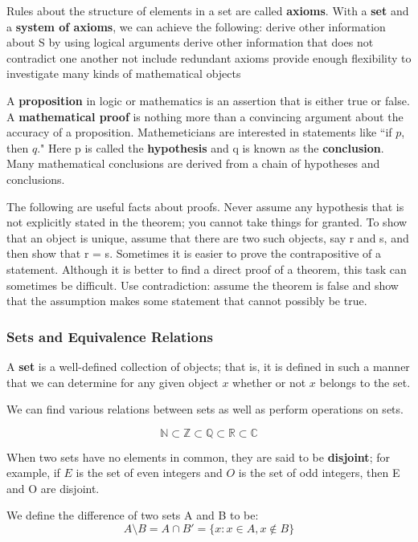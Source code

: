 \documentclass[11pt]{article} %
\begin{document}
\noindent
Rules about the structure of elements in a set are called \textbf{axioms}. With a \textbf{set} and a \textbf{system of axioms}, we can achieve the following:
\points
{derive other information about S by using logical arguments}
{derive other information that does not contradict one another}
{not include redundant axioms}
{provide enough flexibility to investigate many kinds of mathematical objects}

\noindent
A \textbf{proposition} in logic or mathematics is an assertion that is either true or false. A \textbf{mathematical proof} is nothing more than a convincing argument about the accuracy of a proposition. Mathemeticians are interested in statements like ``if $p$, then $q$." Here p is
called the \textbf{hypothesis} and q is known as the \textbf{conclusion}. Many mathematical conclusions are derived from a chain of hypotheses and conclusions.

The following are useful facts about proofs. Never assume any hypothesis that is not explicitly stated in the theorem; you cannot take things for granted. To show that an object is unique, assume that there are two such objects, say r and s, and then show that r = s. Sometimes it is easier to prove the contrapositive of a statement. Although it is better to find a direct proof of a theorem, this task can sometimes be difficult. Use contradiction: assume the theorem is false and show that the assumption makes some statement that cannot possibly be true.

\subsubsection{Sets and Equivalence Relations}
{A \textbf{set} is a well-defined collection of objects; that is, it is defined in such a manner that we can determine for any given object $x$ whether or not $x$ belongs to the set.}

We can find various relations between sets as well as perform operations on sets.

{$$
\mathbb{N} \subset \mathbb{Z} \subset \mathbb{Q} \subset \mathbb{R} \subset \mathbb{C}
$$}

When two sets have no elements in common, they are said to be \textbf{disjoint}; for example, if $E$ is the set of even integers and $O$ is the set of odd integers, then E and O are disjoint.

{We define the difference of two sets A and B to be:
$$
A \setminus B = A \cap B' = \{ x : x \in A, x \notin B\}
$$}
\end{document}
